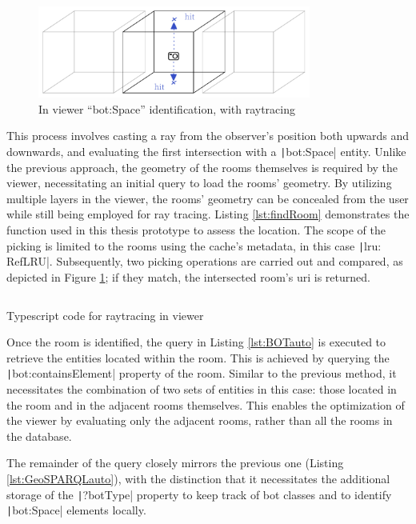 \begin{figure}[H]
    \centering
    \includegraphics[width=0.8\textwidth]{figures/pdf/inViewer.pdf}
    \caption{In viewer \enquote{bot:Space} identification, with raytracing}
    \label{fig:raytrace}
\end{figure}

This process involves casting a ray from the observer's position both upwards and downwards, and evaluating the first intersection with a \texttt|bot:Space| entity. Unlike the previous approach, the geometry of the rooms themselves is required by the viewer, necessitating an initial query to load the rooms' geometry. By utilizing multiple layers in the viewer, the rooms' geometry can be concealed from the user while still being employed for ray tracing. Listing \ref{lst:findRoom} demonstrates the function used in this thesis prototype to assess the location. The scope of the picking is limited to the rooms using the cache's metadata, in this case \texttt|lru: RefLRU|. Subsequently, two picking operations are carried out and compared, as depicted in Figure \ref{fig:raytrace}; if they match, the intersected room's \ac{uri} is returned.

\begin{listing}[h]
    \inputminted{ts}{dynamicQueries/inViewer/raytrace.ts}
    \vspace{-0.7cm}
    \caption{Typescript code for raytracing in viewer}
    \label{lst:findRoom}
\end{listing}

Once the room is identified, the query in Listing \ref{lst:BOTauto} is executed to retrieve the entities located within the room. This is achieved by querying the \texttt|bot:containsElement| property of the room. Similar to the previous method, it necessitates the combination of two sets of entities in this case: those located in the room and in the adjacent rooms themselves. This enables the optimization of the viewer by evaluating only the adjacent rooms, rather than all the rooms in the database.

The remainder of the query closely mirrors the previous one (Listing \ref{lst:GeoSPARQLauto}), with the distinction that it necessitates the additional storage of the \texttt|?botType| property to keep track of \ac{bot} classes and to identify \texttt|bot:Space| elements locally.

